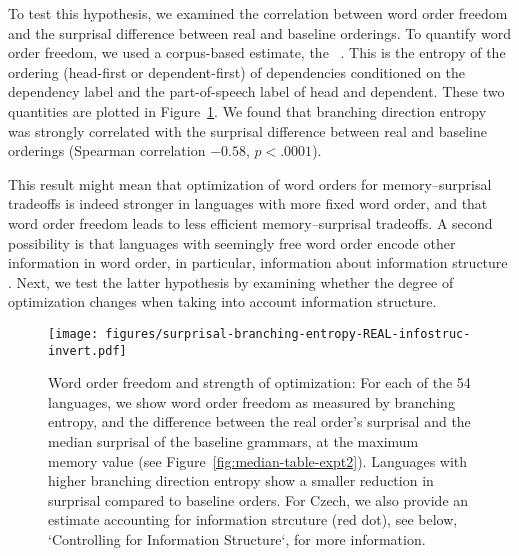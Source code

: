 To test this hypothesis, we examined the correlation between word order freedom and the surprisal difference between real and baseline orderings.
To quantify word order freedom, we used a corpus-based estimate, the ~\citep{futrell-quantifying-2015}.
This is the entropy of the ordering (head-first or dependent-first) of dependencies conditioned on the dependency label and the part-of-speech label of head and dependent.
These two quantities are plotted in Figure~\ref{fig:freedom-surp}.
We found that branching direction entropy was strongly correlated with the surprisal difference between real and baseline orderings (Spearman correlation $-0.58$, $p < .0001$).

This result might mean that optimization of word orders for memory--surprisal tradeoffs is indeed stronger in languages with more fixed word order, and that word order freedom leads to less efficient memory--surprisal tradeoffs.
A second possibility is that languages with seemingly free word order encode other information in word order, in particular, information about information structure \citep[e.g.][]{givon1988pragmatics,firbas1966defining,firbas1974aspects,myhill1985pragmatic}.
Next, we test the latter hypothesis by examining whether the degree of optimization changes when taking into account information structure.




\begin{figure}
\texttt{[image: figures/surprisal-branching-entropy-REAL-infostruc-invert.pdf]}
	\caption{Word order freedom and strength of optimization: For each of the 54 languages, we show word order freedom as measured by branching entropy, and the difference between the real order's surprisal and the median surprisal of the baseline grammars, at the maximum memory value (see Figure~\ref{fig:median-table-expt2}).
	Languages with higher branching direction entropy show a smaller reduction in surprisal compared to baseline orders.
	For Czech, we also provide an estimate accounting for information strcuture (red dot), see below, `Controlling for Information Structure`, for more information.
	}\label{fig:freedom-surp}
\end{figure}

